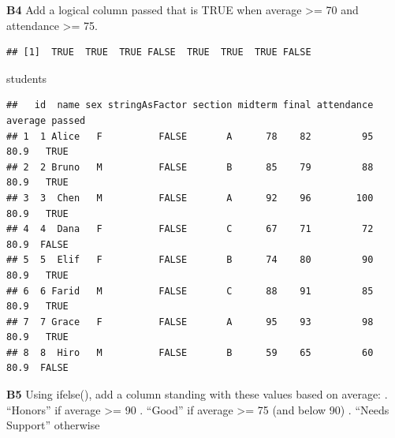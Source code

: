 \documentclass[
]{article}
\newenvironment{Shaded}{\begin{snugshade}}{\end{snugshade}}
\newcommand{\DecValTok}[1]{\textcolor[rgb]{0.00,0.00,0.81}{#1}}
\newcommand{\DocumentationTok}[1]{\textcolor[rgb]{0.56,0.35,0.01}{\textbf{\textit{#1}}}}
\newcommand{\NormalTok}[1]{#1}
\newcommand{\OtherTok}[1]{\textcolor[rgb]{0.56,0.35,0.01}{#1}}
\newcommand{\SpecialCharTok}[1]{\textcolor[rgb]{0.81,0.36,0.00}{\textbf{#1}}}
\begin{document}
\textbf{B4} Add a logical column passed that is TRUE when average
\textgreater= 70 and attendance \textgreater= 75.

\begin{Shaded}
\end{Shaded}

\begin{verbatim}
## [1]  TRUE  TRUE  TRUE FALSE  TRUE  TRUE  TRUE FALSE
\end{verbatim}

\begin{Shaded}
\begin{Highlighting}[]
\NormalTok{students}
\end{Highlighting}
\end{Shaded}

\begin{verbatim}
##   id  name sex stringAsFactor section midterm final attendance average passed
## 1  1 Alice   F          FALSE       A      78    82         95    80.9   TRUE
## 2  2 Bruno   M          FALSE       B      85    79         88    80.9   TRUE
## 3  3  Chen   M          FALSE       A      92    96        100    80.9   TRUE
## 4  4  Dana   F          FALSE       C      67    71         72    80.9  FALSE
## 5  5  Elif   F          FALSE       B      74    80         90    80.9   TRUE
## 6  6 Farid   M          FALSE       C      88    91         85    80.9   TRUE
## 7  7 Grace   F          FALSE       A      95    93         98    80.9   TRUE
## 8  8  Hiro   M          FALSE       B      59    65         60    80.9  FALSE
\end{verbatim}

\textbf{B5} Using ifelse(), add a column standing with these values
based on average: . ``Honors'' if average \textgreater= 90 . ``Good'' if
average \textgreater= 75 (and below 90) . ``Needs Support'' otherwise

\begin{Shaded}
\end{Shaded}
\end{document}
